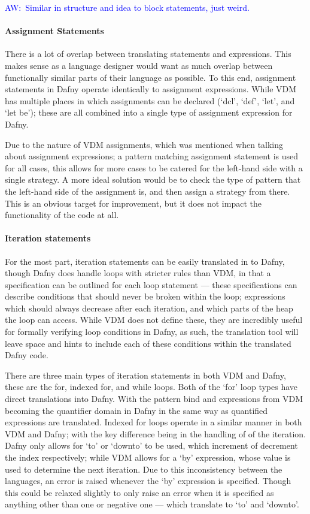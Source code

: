 \documentclass{entcs}
\newcommand{\awcomment}[1]{\ifthenelse { \boolean{showComments} } {\textcolor{blue}{AW:~#1}} { } } %
\begin{document}
\awcomment{Similar in structure and idea to block statements, just weird.}

\paragraph{Assignment Statements}

There is a lot of overlap between translating statements and expressions. This makes sense as a language designer would want as much overlap between functionally similar parts of their language as possible. To this end, assignment statements in Dafny operate identically to assignment expressions. While VDM has multiple places in which assignments can be declared (`dcl', `def', `let', and `let be'); these are all combined into a single type of assignment expression for Dafny. 

Due to the nature of VDM assignments, which was mentioned when talking about assignment expressions; a pattern matching assignment statement is used for all cases, this allows for more cases to be catered for the left-hand side with a single strategy. A more ideal solution would be to check the type of pattern that the left-hand side of the assignment is, and then assign a strategy from there. This is an obvious target for improvement, but it does not impact the functionality of the code at all.

\paragraph{Iteration statements}

For the most part, iteration statements can be easily translated in to Dafny, though Dafny does handle loops with stricter rules than VDM, in that a specification can be outlined for each loop statement --- these specifications can describe conditions that should never be broken within the loop; expressions which should always decrease after each iteration, and which parts of the heap the loop can access. While VDM does not define these, they are incredibly useful for formally verifying loop conditions in Dafny, as such, the translation tool will leave space and hints to include each of these conditions within the translated Dafny code.

There are three main types of iteration statements in both VDM and Dafny, these are the for, indexed for, and while loops. Both of the `for' loop types have direct translations into Dafny. With the pattern bind and expressions from VDM becoming the quantifier domain in Dafny in the same way as quantified expressions are translated. Indexed for loops operate in a similar manner in both VDM and Dafny; with the key difference being in the handling of of the iteration. Dafny only allows for `to' or `downto' to be used, which increment of decrement the index respectively; while VDM allows for a `by' expression, whose value is used to determine the next iteration. Due to this inconsistency between the languages, an error is raised whenever the `by' expression is specified. Though this could be relaxed slightly to only raise an error when it is specified as anything other than one or negative one --- which translate to `to' and `downto'.
\end{document}
